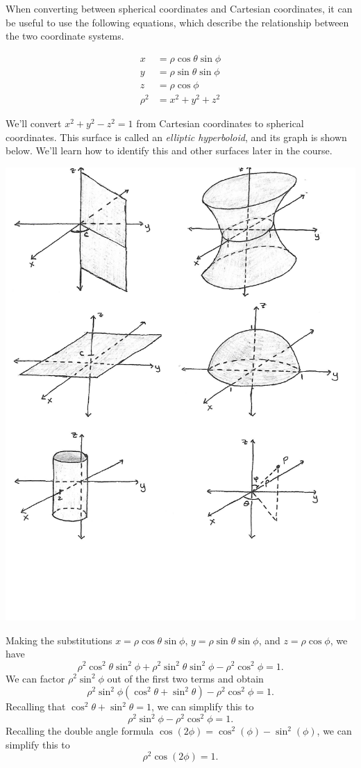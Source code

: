 \documentclass{ximera}
\begin{document}
When converting between spherical coordinates and Cartesian coordinates, it can be useful to use the following equations, which describe the relationship between the two coordinate systems.

\begin{align*}
x &= \rho\cos\theta\sin\phi\\
y &= \rho\sin\theta\sin\phi\\
z &= \rho\cos\phi\\
\rho^2 &= x^2 + y^2 + z^2
\end{align*}

\begin{example}
We'll convert $x^2 + y^2 - z^2 = 1$ from Cartesian coordinates to spherical coordinates. This surface is called an \emph{elliptic hyperboloid}, and its graph is shown below. We'll learn how to identify this and other surfaces later in the course.

\begin{image}
\includegraphics{elliptic_hyper}
\end{image}

Making the substitutions $x = \rho\cos\theta\sin\phi$, $y = \rho\sin\theta\sin\phi$, and $z = \rho\cos\phi$, we have
\[
\rho^2\cos^2\theta\sin^2\phi + \rho^2\sin^2\theta\sin^2\phi - \rho^2\cos^2\phi = 1.
\]
We can factor $\rho^2\sin^2\phi$ out of the first two terms and obtain
\[
\rho^2\sin^2\phi (\cos^2\theta+ \sin^2\theta) - \rho^2\cos^2\phi = 1.
\]
Recalling that $\cos^2\theta+ \sin^2\theta = 1$, we can simplify this to
\[
\rho^2\sin^2\phi  - \rho^2\cos^2\phi = 1.
\]
Recalling the double angle formula $\cos(2\phi) = \cos^2(\phi) - \sin^2(\phi)$, we can simplify this to
\[
\rho^2\cos(2\phi) = 1.
\]
\end{example}
\end{document}

